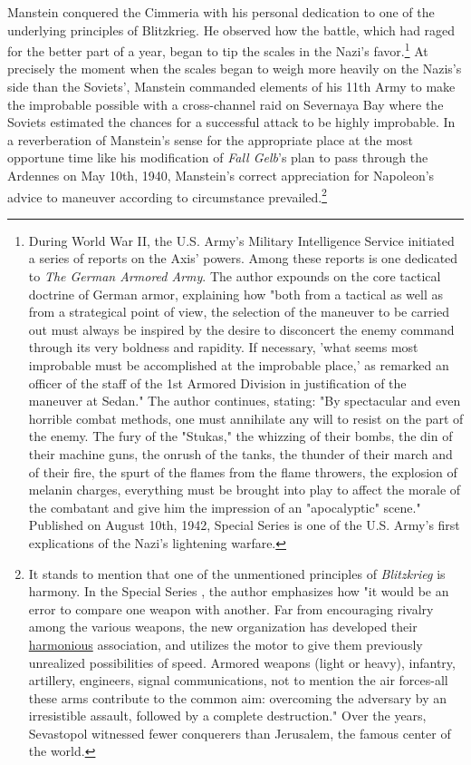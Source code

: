 \documentclass[10pt,a4paper,twoside]{article} %
\begin{document}
\begin{multicols}{2}
{\newline \indent Manstein conquered the Cimmeria with his personal dedication to one of the underlying principles of Blitzkrieg. He observed how the battle, which had raged for the better part of a year, began to tip the scales in the Nazi's favor.\footnote{During World War II, the U.S. Army's Military Intelligence Service initiated a series of reports on the Axis' powers. Among these reports is one dedicated to \emph{The German Armored Army}. The author expounds on the core tactical doctrine of German armor, explaining how "both from a tactical as well as from a strategical point of view, the selection of the maneuver to be carried out must always be inspired by the desire to disconcert the enemy command through its very boldness and rapidity. If necessary, 'what seems most improbable must be accomplished at the improbable place,' as remarked an officer of the staff of the 1st Armored Division in justification of the maneuver at Sedan." The author continues, stating: "By spectacular and even horrible combat methods, one must annihilate any will to resist on the part of the enemy. The fury of the "Stukas," the whizzing of their bombs, the din of their machine guns, the onrush of the tanks, the thunder of their march and of their fire, the spurt of the flames from the flame throwers, the explosion of melanin charges, everything must be brought into play to affect the morale of the combatant and give him the impression of an "apocalyptic" scene." Published on August 10th, 1942, Special Series  is one of the U.S. Army's first explications of the Nazi's lightening warfare.} At precisely the moment when the scales began to weigh more heavily on the Nazis's side than the Soviets', Manstein commanded elements of his 11th Army to make the improbable possible with a cross-channel raid on Severnaya Bay where the Soviets estimated the chances for a successful attack to be highly improbable. In a reverberation of Manstein's sense for the appropriate place at the most opportune time like his modification of \emph{Fall Gelb}'s plan to pass through the Ardennes on May 10th, 1940, Manstein's correct appreciation for Napoleon's advice to maneuver according to circumstance prevailed.\footnote{It stands to mention that one of the unmentioned principles of \emph{Blitzkrieg} is harmony. In the Special Series , the author emphasizes how "it would be an error to compare one weapon with another. Far from encouraging rivalry among the various weapons, the new organization has developed their \underline{harmonious} association, and utilizes the motor to give them previously unrealized possibilities of speed. Armored weapons (light or heavy), infantry, artillery, engineers, signal communications, not to mention the air forces-all these arms contribute to the common aim: overcoming the adversary by an irresistible assault, followed by a complete destruction." \newline \indent Over the years, Sevastopol witnessed fewer conquerers than Jerusalem, the famous center of the world.}
}

\end{multicols}
\end{document}
